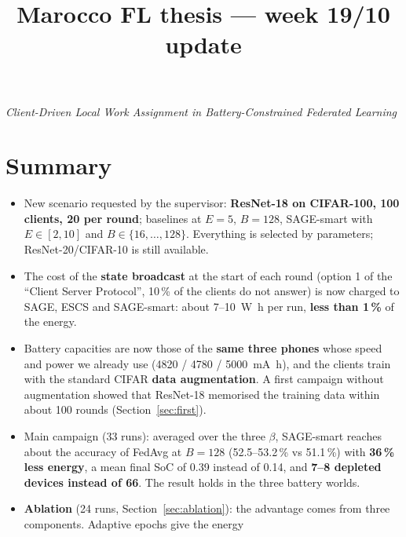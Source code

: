 \documentclass[11pt,a4paper]{article}
\title{\bfseries Marocco FL thesis --- week 19/10 update}
\author{}
\date{}
\begin{document}
\maketitle
\vspace{-3.2em}
\begin{center}
\emph{Client-Driven Local Work Assignment in Battery-Constrained Federated Learning}
\end{center}
\vspace{1em}

\section*{Summary}

\begin{itemize}
  \item New scenario requested by the supervisor: \textbf{ResNet-18 on
        CIFAR-100, 100 clients, 20 per round}; baselines at $E=5$, $B=128$,
        SAGE-smart with $E\in[2,10]$ and $B\in\{16,\dots,128\}$. Everything is
        selected by parameters; ResNet-20/CIFAR-10 is still available.
  \item The cost of the \textbf{state broadcast} at the start of each round
        (option 1 of the ``Client Server Protocol'', 10\,\% of the clients do
        not answer) is now charged to SAGE, ESCS and SAGE-smart: about
        \SI{7}{}--\SI{10}{\watt\hour} per run, \textbf{less than 1\,\%} of the
        energy.
  \item Battery capacities are now those of the \textbf{same three phones}
        whose speed and power we already use (\SI{4820}{} / \SI{4780}{} /
        \SI{5000}{\milli\ampere\hour}), and the clients train with the standard
        CIFAR \textbf{data augmentation}. A first campaign without
        augmentation showed that ResNet-18 memorised the training data within
        about 100 rounds (Section~\ref{sec:first}).
  \item Main campaign (33 runs): averaged over the three $\beta$, SAGE-smart
        reaches about the accuracy of FedAvg at $B=128$ (52.5--53.2\,\% vs
        51.1\,\%) with \textbf{36\,\% less energy}, a mean final SoC of 0.39
        instead of 0.14, and \textbf{7--8 depleted devices instead of 66}. The
        result holds in the three battery worlds.
  \item \textbf{Ablation} (24 runs, Section~\ref{sec:ablation}): the
        advantage comes from three components. Adaptive epochs give the energy

\end{itemize}
\end{document}
